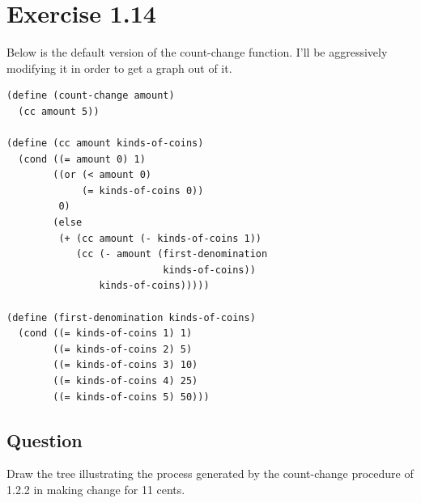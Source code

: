 \documentclass[final,fleqn,titlepage]{article}
\begin{document}
\section{Exercise 1.14}
\label{sec:org94301f3}
Below is the default version of the count-change function. I'll be aggressively
modifying it in order to get a graph out of it.
\begin{verbatim}
(define (count-change amount)
  (cc amount 5))

(define (cc amount kinds-of-coins)
  (cond ((= amount 0) 1)
        ((or (< amount 0)
             (= kinds-of-coins 0))
         0)
        (else
         (+ (cc amount (- kinds-of-coins 1))
            (cc (- amount (first-denomination
                           kinds-of-coins))
                kinds-of-coins)))))

(define (first-denomination kinds-of-coins)
  (cond ((= kinds-of-coins 1) 1)
        ((= kinds-of-coins 2) 5)
        ((= kinds-of-coins 3) 10)
        ((= kinds-of-coins 4) 25)
        ((= kinds-of-coins 5) 50)))
\end{verbatim}
\subsection{Question}
\label{sec:org66aef9d}
Draw the tree illustrating the process generated by the count-change procedure
of 1.2.2 in making change for 11 cents.
\end{document}
